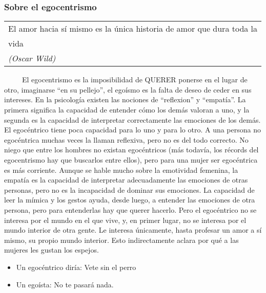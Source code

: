 \protect\hypertarget{M22}{}{}

\hypertarget{sobre-el-egocentrismo}{\subsubsection{Sobre el
egocentrismo}\label{sobre-el-egocentrismo}}

\begin{longtable}[]{@{}l@{}}
\toprule
El amor hacia sí mismo es la única historia de amor que dura toda
la\tabularnewline
vida\tabularnewline
\emph{(Oscar Wild)}\tabularnewline
\bottomrule
\end{longtable}

~ ~ ~ El egocentrismo es la imposibilidad de QUERER ponerse en el lugar
de otro, imaginarse ``en su pellejo'', el egoísmo es la falta de deseo
de ceder en sus intereses. En la psicología existen las nociones de
``reflexion'' y ``empatía''. La primera significa la capacidad de
entender cómo los demás valoran a uno, y la segunda es la capacidad de
interpretar correctamente las emociones de los demás. El egocéntrico
tiene poca capacidad para lo uno y para lo otro. A una persona no
egocéntrica muchas veces la llaman reflexiva, pero no es del todo
correcto. No niego que entre los hombres no existan egocéntricos (más
todavía, los récords del egocentrismo hay que buscarlos entre ellos),
pero para una mujer ser egocéntrica es más corriente. Aunque se hable
mucho sobre la emotividad femenina, la empatía es la capacidad de
interpretar adecuadamente las emociones de otras personas, pero no es la
incapacidad de dominar sus emociones. La capacidad de leer la mímica y
los gestos ayuda, desde luego, a entender las emociones de otra persona,
pero para entenderlas hay que querer hacerlo. Pero el egocéntrico no se
interesa por el mundo en el que vive, y, en primer lugar, no se interesa
por el mundo interior de otra gente. Le interesa únicamente, hasta
profesar un amor a sí mismo, su propio mundo interior. Esto
indirectamente aclara por qué a las mujeres les gustan los espejos.

\begin{itemize}
\tightlist
\item
  Un egocéntrico diría: Vete sin el perro\\
\item
  Un egoísta: No te pasará nada.
\end{itemize}


